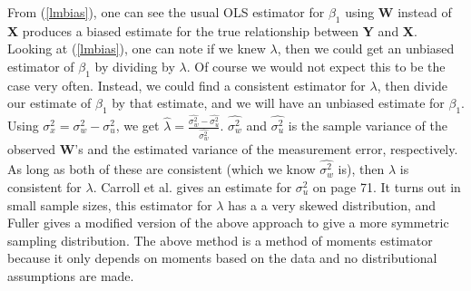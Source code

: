 \documentclass[11pt]{article}\usepackage[]{graphicx}\usepackage[]{color}
\begin{document}
From (\ref{lmbias}), one can see the usual OLS estimator for $\beta_1$ using {\bf W} instead of {\bf X} produces a biased estimate for the true relationship between {\bf Y} and {\bf X}. Looking at (\ref{lmbias}), one can note if we knew $\lambda$, then we could get an unbiased estimator of $\beta_1$ by dividing by $\lambda$. Of course we would not expect this to be the case very often. Instead, we could find a consistent estimator for $\lambda$, then divide our estimate of $\beta_1$ by that estimate, and we will have an unbiased estimate for $\beta_1$. Using $\sigma_x^2 = \sigma_w^2 - \sigma_u^2$, we get $\hat{\lambda} = \frac{\hat{\sigma_w^2} - \hat{\sigma_u^2}}{\hat{\sigma_w^2}}$. $\hat{\sigma_w^2}$ and $\hat{\sigma_u^2}$ is the sample variance of the observed {\bf W}'s and the estimated variance of the measurement error, respectively. As long as both of these are consistent (which we know $\hat{\sigma_w^2}$ is), then $\hat{\lambda}$ is consistent for $\lambda$. Carroll et al. gives an estimate for $\sigma_u^2$ on page 71. It turns out in small sample sizes, this estimator for $\lambda$ has a a very skewed distribution, and Fuller \cite{linear} gives a modified version of the above approach to give a more symmetric sampling distribution. The above method is a method of moments estimator because it only depends on moments based on the data and no distributional assumptions are made. 


\end{document}
